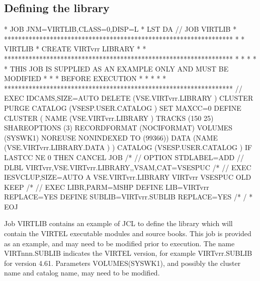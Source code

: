 \documentclass[letterpaper,10pt,english]{sphinxmanual}
\begin{document}
\subsection{Defining the library}
\label{\detokenize{Installation_Guide:defining-the-library}}
\begin{sphinxVerbatim}[commandchars=\\\{\}]
* \PYGZdl{}\PYGZdl{} JOB JNM=VIRTLIB,CLASS=0,DISP=L
* \PYGZdl{}\PYGZdl{} LST DA
// JOB VIRTLIB
* *****************************************************************
* * VIRTLIB * CREATE VIRTvrr LIBRARY                              *
* *****************************************************************
* *                                                               *
* * THIS JOB IS SUPPLIED AS AN EXAMPLE ONLY AND MUST BE MODIFIED  *
* * BEFORE EXECUTION                                              *
* *                                                               *
* *****************************************************************
// EXEC IDCAMS,SIZE=AUTO
 DELETE (VSE.VIRTvrr.LIBRARY ) \PYGZhy{}
          CLUSTER \PYGZhy{}
          PURGE \PYGZhy{}
    CATALOG (VSESP.USER.CATALOG )
 SET MAXCC=0
 DEFINE CLUSTER ( \PYGZhy{}
            NAME (VSE.VIRTvrr.LIBRARY ) \PYGZhy{}
            TRACKS (150 25) \PYGZhy{}
            SHAREOPTIONS (3) \PYGZhy{}
            RECORDFORMAT (NOCIFORMAT) \PYGZhy{}
            VOLUMES (SYSWK1) \PYGZhy{}
            NOREUSE \PYGZhy{}
            NONINDEXED \PYGZhy{}
            TO (99366)) \PYGZhy{}
            DATA (NAME (VSE.VIRTvrr.LIBRARY.DATA ) ) \PYGZhy{}
            CATALOG (VSESP.USER.CATALOG )
 IF LASTCC NE 0 THEN CANCEL JOB
/*
// OPTION STDLABEL=ADD
// DLBL VIRTvrr,\PYGZsq{}VSE.VIRTvrr.LIBRARY\PYGZsq{},,VSAM,CAT=VSESPUC
/*
// EXEC IESVCLUP,SIZE=AUTO
A VSE.VIRTvrr.LIBRARY        VIRTvrr VSESPUC OLD KEEP
/*
// EXEC LIBR,PARM=\PYGZsq{}MSHP\PYGZsq{}
              DEFINE LIB=VIRTvrr REPLACE=YES
              DEFINE SUBLIB=VIRTvrr.SUBLIB REPLACE=YES
/*
/\PYGZam{}
* \PYGZdl{}\PYGZdl{} EOJ
\end{sphinxVerbatim}


Job VIRTLIB contains an example of JCL to define the library which will contain the VIRTEL executable modules and source books. This job is provided as an example, and may need to be modified prior to execution. The name VIRTnnn.SUBLIB indicates the VIRTEL version, for example VIRTvrr.SUBLIB for version 4.61. Parameters VOLUMES(SYSWK1), and possibly the cluster name and catalog name, may need to be modified.
\end{document}
